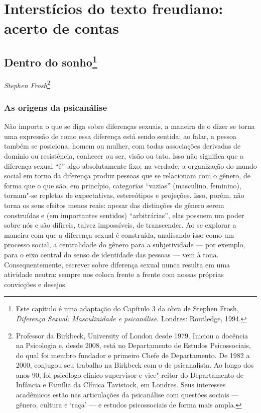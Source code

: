 \part{Interstícios do texto freudiano:\\ acerto de contas}

\chapter*{Dentro do sonho\footnote{Este capítulo é uma adaptação do
  Capítulo 3 da obra de Stephen Frosh, \emph{Diferença Sexual:
  Masculinidade e psicanálise}. Londres: Routledge, 1994.}}


\begin{flushright}
\emph{Stephen Frosh}\footnote{Professor da Birkbeck, University of London desde 1979.
Iniciou a docência na Psicologia e, desde 2008, está no Departamento de
Estudos Psicossociais, do qual foi membro fundador e primeiro Chefe de
Departamento. De 1982 a 2000, conjugou seu trabalho na Birkbeck com o de
psicanalista. Ao longo dos anos 90, foi psicólogo clínico supervisor e vice"-reitor
do Departamento de Infância e Família da Clínica Tavistock, em Londres. Seus
interesses acadêmicos estão nas articulações da psicanálise com questões sociais
--- gênero, cultura e ‘raça' --- e estudos psicossociais de forma mais ampla.}
\end{flushright}

\section{As origens da psicanálise}

Não importa o que se diga sobre diferenças sexuais, a maneira de o dizer
se torna uma expressão de como essa diferença está sendo sentida; ao
falar, a pessoa também se posiciona, homem ou mulher, com todas
associações derivadas de domínio ou resistência, conhecer ou ser, visão
ou tato. Isso não significa que a diferença sexual ``é'' algo
absolutamente fixo; na verdade, a organização do mundo social em torno
da diferença produz pessoas que se relacionam com o gênero, de forma que
o que são, em princípio, categorias ``vazias'' (masculino, feminino),
tornam"-se repletas de expectativas, estereótipos e projeções. Isso,
porém, não torna os seus efeitos menos reais: apesar das distinções de
gênero serem construídas e (em importantes sentidos) ``arbitrárias'',
elas possuem um poder sobre nós e são difíceis, talvez impossíveis, de
transcender. Ao se explorar a maneira com que a diferença sexual é
construída, analisando isso como um processo social, a centralidade do
gênero para a subjetividade --- por exemplo, para o eixo central do senso
de identidade das pessoas --- vem à tona. Consequentemente, escrever
sobre diferença sexual nunca resulta em uma atividade neutra: sempre nos
coloca frente a frente com nossas próprias convicções e desejos.

